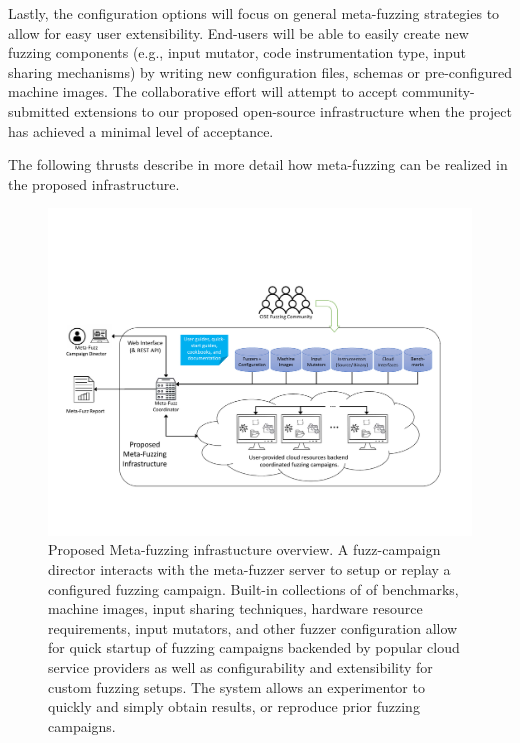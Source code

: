 Lastly, the configuration options will focus on general meta-fuzzing strategies 
to allow for easy user extensibility.  End-users will be able to easily create 
new fuzzing components (e.g., input mutator, code instrumentation type, input 
sharing mechanisms) by writing new configuration files, schemas or 
pre-configured machine images.  The collaborative effort will attempt to accept 
community-submitted extensions to our proposed open-source infrastructure when 
the project has achieved a minimal level of acceptance.

The following thrusts describe in more detail how meta-fuzzing can be realized 
in the proposed infrastructure.


\begin{figure}[htbp!]


\includegraphics[width=\textwidth,trim={0.4in 1.25in 0.8in 2.0in},clip]{figures/mf-arch.pdf}

\caption{Proposed Meta-fuzzing infrastucture overview.  
A fuzz-campaign director interacts with the meta-fuzzer server to setup or replay a configured fuzzing campaign.  
Built-in collections of of benchmarks, machine images, input sharing techniques, hardware resource requirements, input mutators, and other fuzzer configuration 
allow for quick startup of fuzzing campaigns backended by popular cloud service providers as well as configurability and extensibility for custom fuzzing setups.  
The system allows an experimentor to quickly and simply obtain results, or reproduce prior fuzzing campaigns.}
\label{fig:overview}
\end{figure}



